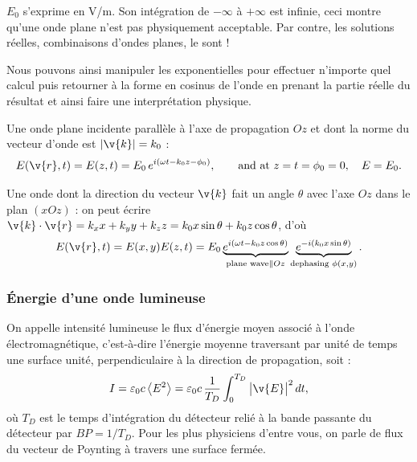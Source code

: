 \begin{remark}
  $E_0$ s'exprime en V/m. Son intégration de $-\infty$ à $+\infty$ est infinie,
  ceci montre qu'une onde plane n'est pas physiquement acceptable. Par contre,
  les solutions réelles, combinaisons d'ondes planes, le sont !
\end{remark}

Nous pouvons ainsi manipuler les exponentielles pour effectuer n'importe quel
calcul puis retourner à la forme en cosinus de l'onde en prenant la partie réelle
du résultat et ainsi faire une interprétation physique.

\begin{example}
  \begin{subpart}
    \item Une onde plane incidente parallèle à l'axe de propagation $Oz$ et dont
      la norme du vecteur d'onde est $|\v{k}|=k_0$ :
      \[
        E(\v{r},t)=E(z,t)=E_0\,e^{i(\omega t-k_0z-\phi_0)},
        \qquad\text{and at } z=t=\phi_0=0,\quad E=E_0 .
      \]
    \item Une onde dont la direction du vecteur $\v{k}$ fait un angle $\theta$
      avec l'axe $Oz$ dans le plan $(xOz)$ : on peut écrire
      $\v{k}\cdot\v{r}=k_xx+k_yy+k_zz=k_0x\sin\theta+k_0z\cos\theta$, d'où
      \[
        E(\v{r},t)=E(x,y)E(z,t)=E_0
        \underbrace{e^{i(\omega t-k_0z\cos\theta)}}_{\text{plane wave} \parallel Oz}
        \underbrace{e^{-i(k_0x\sin\theta)}}_{\text{dephasing }\phi(x,y)} .
      \]
  \end{subpart}
\end{example}

\subsubsection{Énergie d'une onde lumineuse}

\begin{definition}
  On appelle intensité lumineuse le flux d'énergie moyen associé à l'onde
  électromagnétique, c'est-à-dire l'énergie moyenne traversant par unité de
  temps une surface unité, perpendiculaire à la direction de propagation, soit :
  \[
    I=\varepsilon_0c\left\langle E^2\right\rangle
     =\varepsilon_0c\,\frac{1}{T_D}\int_0^{T_D}\big|\v{E}\big|^2\,dt ,
  \]
  où $T_D$ est le temps d'intégration du détecteur relié à la bande passante du
  détecteur par $BP=1/T_D$. Pour les plus physiciens d'entre vous, on parle de
  flux du vecteur de Poynting à travers une surface fermée.
\end{definition}

